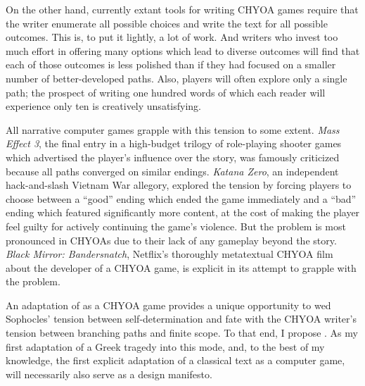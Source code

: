 On the other hand, currently extant tools for writing CHYOA games require that the writer
enumerate all possible choices and write the text for all possible outcomes. This is, to
put it lightly, a lot of work. And writers who invest too much effort in offering many
options which lead to diverse outcomes will find that each of those outcomes is less
polished than if they had focused on a smaller number of better-developed paths. Also,
players will often explore only a single path; the prospect of writing one hundred words
of which each reader will experience only ten is creatively unsatisfying.

All narrative computer games grapple with this tension to some extent. \textit{Mass Effect
  3}, the final entry in a high-budget trilogy of role-playing shooter games which
advertised the player's influence over the story, was famously criticized because all
paths converged on similar endings. \textit{Katana Zero}, an independent hack-and-slash
Vietnam War allegory, explored the tension by forcing players to choose between a
\enquote{good} ending which ended the game immediately and a \enquote{bad} ending which
featured significantly more content, at the cost of making the player feel guilty for
actively continuing the game's violence. But the problem is most pronounced in CHYOAs due
to their lack of any gameplay beyond the story. \textit{Black Mirror: Bandersnatch},
Netflix's thoroughly metatextual CHYOA film about the developer of a CHYOA game, is
explicit in its attempt to grapple with the problem.


An adaptation of \theplay{} as a CHYOA game provides a unique opportunity to wed
Sophocles' tension between self-determination and fate with the CHYOA writer's tension
between branching paths and finite scope. To that end, I propose \thegame{}. As my first
adaptation of a Greek tragedy into this mode, and, to the best of my knowledge, the first
explicit adaptation of a classical text as a computer game, \thegame{} will necessarily
also serve as a design manifesto.


\newcommand{\selfcontrol}{\texttt{\textsc{Self Control}}}

